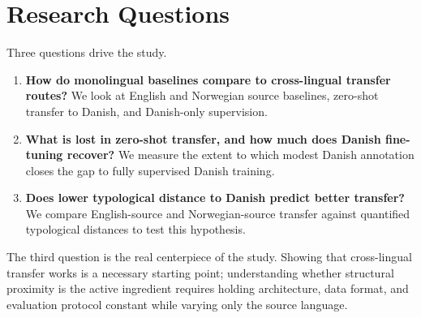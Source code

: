 \section{Research Questions}

Three questions drive the study.

\begin{enumerate}
  \item \textbf{How do monolingual baselines compare to cross-lingual transfer routes?} We look at English and Norwegian source baselines, zero-shot transfer to Danish, and Danish-only supervision.
  \item \textbf{What is lost in zero-shot transfer, and how much does Danish fine-tuning recover?} We measure the extent to which modest Danish annotation closes the gap to fully supervised Danish training.
  \item \textbf{Does lower typological distance to Danish predict better transfer?} We compare English-source and Norwegian-source transfer against quantified typological distances to test this hypothesis.
\end{enumerate}

The third question is the real centerpiece of the study. Showing that cross-lingual transfer works is a necessary starting point; understanding whether structural proximity is the active ingredient requires holding architecture, data format, and evaluation protocol constant while varying only the source language.
